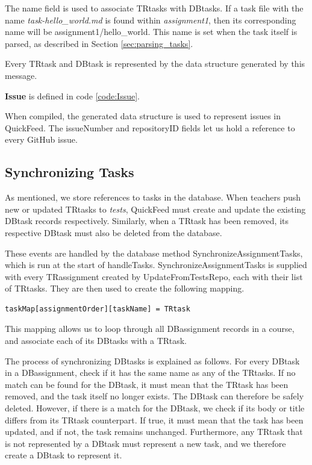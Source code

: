 The name field is used to associate TRtasks with DBtasks.
If a task file with the name \textit{task-hello\_world.md} is found within \textit{assignment1}, then its corresponding name will be assignment1/hello\_world.
This name is set when the task itself is parsed, as described in Section \ref{sec:parsing_tasks}.

Every TRtask and DBtask is represented by the data structure generated by this message.

\textbf{Issue} is defined in code \ref{code:Issue}.



When compiled, the generated data structure is used to represent issues in QuickFeed.
The issueNumber and repositoryID fields let us hold a reference to every GitHub issue.

\subsection{Synchronizing Tasks}

As mentioned, we store references to tasks in the database.
When teachers push new or updated TRtasks to \textit{tests}, QuickFeed must create and update the existing DBtask records respectively.
Similarly, when a TRtask has been removed, its respective DBtask must also be deleted from the database.

These events are handled by the database method SynchronizeAssignmentTasks, which is run at the start of handleTasks.
SynchronizeAssignmentTasks is supplied with every TRassignment created by UpdateFromTestsRepo, each with their list of TRtasks.
They are then used to create the following mapping.
\begin{lstlisting}[caption={Task mapping}, language=Golang, label={code:task-mapping}, numbers=none, basicstyle=\ttfamily\footnotesize]
taskMap[assignmentOrder][taskName] = TRtask
\end{lstlisting}
This mapping allows us to loop through all DBassignment records in a course, and associate each of its DBtasks with a TRtask.

The process of synchronizing DBtasks is explained as follows.
For every DBtask in a DBassignment, check if it has the same name as any of the TRtasks.
If no match can be found for the DBtask, it must mean that the TRtask has been removed, and the task itself no longer exists.
The DBtask can therefore be safely deleted.
However, if there is a match for the DBtask, we check if its body or title differs from its TRtask counterpart.
If true, it must mean that the task has been updated, and if not, the task remains unchanged.
Furthermore, any TRtask that is not represented by a DBtask must represent a new task, and we therefore create a DBtask to represent it.

